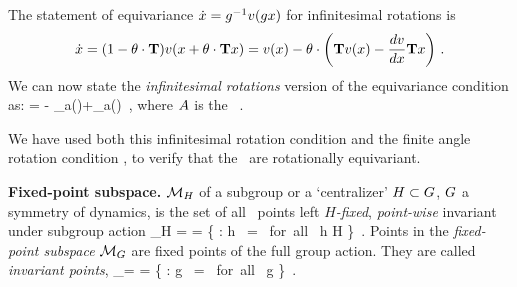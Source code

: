 {The statement of equivariance
$
\dot{x}=g^{-1} v(g x)
$
for infinitesimal rotations is
\[
\dot{x}=(1-{\bf \theta} \cdot \mathbf{T} ) v(x+{\bf \theta} \cdot \mathbf{T}  x)
       =v(x)-{\bf \theta} \cdot \left(
            \mathbf{T} v(x) - \frac{dv}{dx} \mathbf{T} x
                     \right)
\,.
\]
We can now state the {\em infinitesimal
rotations} version of the equivariance condition
 as:
 = - \groupTan_{a}(\vel)+\Mvar \groupTan_{a}(\ssp)
\,,
\label{eq:InfnmslRot}
\eeq
where $A$ is the \stabmat\ .

We have used both this infinitesimal rotation condition and
the finite angle rotation condition , to
verify that the \cLe\ are rotationally equivariant.


\begin{definition}
\label{def:centralizer}
\textbf{Fixed-point subspace.}
${\cal M}_H$ of a subgroup or a `centralizer' $H \subset G$,
$G$ a symmetry of dynamics, is the set of all \statesp\
points left \emph{$H$-fixed}, \emph{point-wise} invariant
under subgroup action
\beq
\pS_H =  =
   \{ \ssp \in \pS : {h} \, \ssp = \ssp \mbox{ for all } h \in H \}
\,.
Points in the \emph{fixed-point subspace}  ${\cal M}_{G}$ are fixed
points of the full group action. They are called \emph{invariant
points},
\beq
\pS_\Group = \Fix{\Group} =
   \{ \ssp \in \pS : {g} \, \ssp = \ssp \mbox{ for all } g \in \Group \}
\,.
\end{definition}
		                                                  \toCB

}
